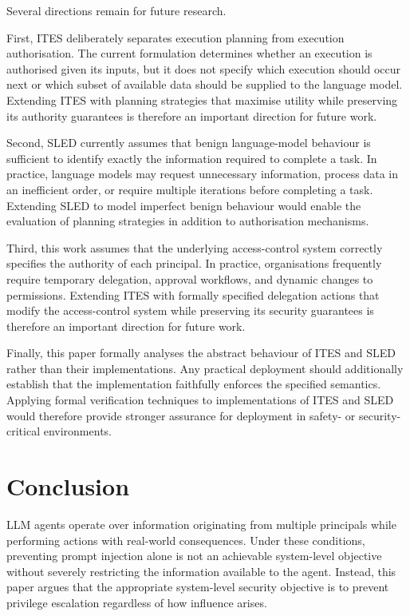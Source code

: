 \documentclass{article} %
\begin{document}
Several directions remain for future research.

First, ITES deliberately separates execution planning from execution authorisation. The current formulation determines whether an execution is authorised given its inputs, but it does not specify which execution should occur next or which subset of available data should be supplied to the language model. Extending ITES with planning strategies that maximise utility while preserving its authority guarantees is therefore an important direction for future work.

Second, SLED currently assumes that benign language-model behaviour is sufficient to identify exactly the information required to complete a task. In practice, language models may request unnecessary information, process data in an inefficient order, or require multiple iterations before completing a task. Extending SLED to model imperfect benign behaviour would enable the evaluation of planning strategies in addition to authorisation mechanisms.

Third, this work assumes that the underlying access-control system correctly specifies the authority of each principal. In practice, organisations frequently require temporary delegation, approval workflows, and dynamic changes to permissions. Extending ITES with formally specified delegation actions that modify the access-control system while preserving its security guarantees is therefore an important direction for future work.

Finally, this paper formally analyses the abstract behaviour of ITES and SLED rather than their implementations. Any practical deployment should additionally establish that the implementation faithfully enforces the specified semantics. Applying formal verification techniques to implementations of ITES and SLED would therefore provide stronger assurance for deployment in safety- or security-critical environments.












\section{Conclusion}

LLM agents operate over information originating from multiple principals while performing actions with real-world consequences. Under these conditions, preventing prompt injection alone is not an achievable system-level objective without severely restricting the information available to the agent. Instead, this paper argues that the appropriate system-level security objective is to prevent privilege escalation regardless of how influence arises.
\end{document}
